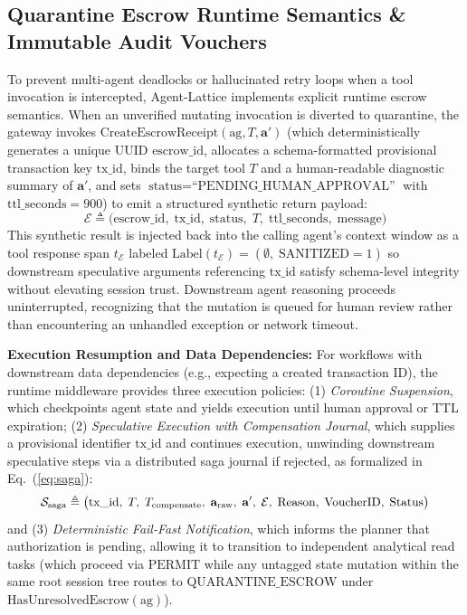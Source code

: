 \documentclass[conference,10pt]{IEEEtran}
\begin{document}
\subsection{Quarantine Escrow Runtime Semantics \& Immutable Audit Vouchers}
\label{sec:escrow}
To prevent multi-agent deadlocks or hallucinated retry loops when a tool invocation is intercepted, Agent-Lattice implements explicit runtime escrow semantics. When an unverified mutating invocation is diverted to quarantine, the gateway invokes $\text{CreateEscrowReceipt}(\text{ag}, T, \mathbf{a}')$ (which deterministically generates a unique UUID $\text{escrow\_id}$, allocates a schema-formatted provisional transaction key $\text{tx\_id}$, binds the target tool $T$ and a human-readable diagnostic summary of $\mathbf{a}'$, and sets $\text{status} = \text{``PENDING\_HUMAN\_APPROVAL''}$ with $\text{ttl\_seconds} = 900$) to emit a structured synthetic return payload:
\begin{equation}
\label{eq:escrow}
\mathcal{E} \triangleq \big( \text{escrow\_id}, \; \text{tx\_id}, \; \text{status}, \; T, \; \text{ttl\_seconds}, \; \text{message} \big)
\end{equation}
This synthetic result is injected back into the calling agent's context window as a tool response span $t_{\mathcal{E}}$ labeled $\text{Label}(t_{\mathcal{E}}) = (\emptyset, \; \text{SANITIZED} = 1)$ so downstream speculative arguments referencing $\text{tx\_id}$ satisfy schema-level integrity without elevating session trust. Downstream agent reasoning proceeds uninterrupted, recognizing that the mutation is queued for human review rather than encountering an unhandled exception or network timeout.

\noindent\textbf{Execution Resumption and Data Dependencies:} For workflows with downstream data dependencies (e.g., expecting a created transaction ID), the runtime middleware provides three execution policies: (1) \textit{Coroutine Suspension}, which checkpoints agent state and yields execution until human approval or TTL expiration; (2) \textit{Speculative Execution with Compensation Journal}, which supplies a provisional identifier $\text{tx\_id}$ and continues execution, unwinding downstream speculative steps via a distributed saga journal if rejected, as formalized in Eq.~(\ref{eq:saga}):
\begin{equation}
\label{eq:saga}
\resizebox{0.89\columnwidth}{!}{$\displaystyle
\mathcal{S}_{\text{saga}} \triangleq \big( \text{tx\_id}, \; T, \; T_{\text{compensate}}, \; \mathbf{a}_{\text{raw}}, \; \mathbf{a}', \; \mathcal{E}, \; \text{Reason}, \; \text{VoucherID}, \; \text{Status} \big)
$}
\end{equation}
and (3) \textit{Deterministic Fail-Fast Notification}, which informs the planner that authorization is pending, allowing it to transition to independent analytical read tasks (which proceed via $\text{PERMIT}$ while any untagged state mutation within the same root session tree routes to $\text{QUARANTINE\_ESCROW}$ under $\text{HasUnresolvedEscrow}(\text{ag})$).
\end{document}
